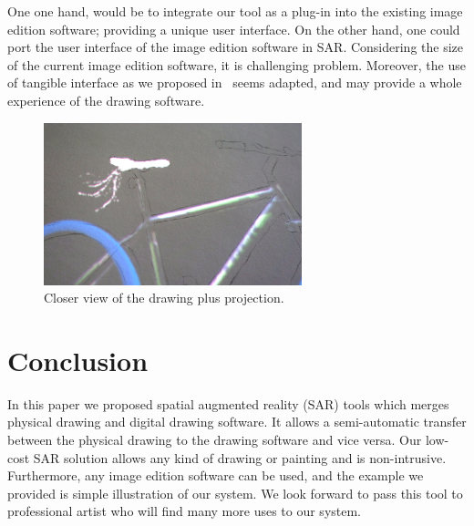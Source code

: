 \documentclass{article}
\begin{document}
One one hand, would be to integrate our tool as a plug-in into the existing image edition software; providing a unique user interface. On the other hand, one could port the user interface of the image edition software in SAR. Considering the size of the current image edition software, it is challenging problem. Moreover, the use of tangible interface as we proposed in~\cite{laviole:2012} seems adapted, and may provide a whole experience of the drawing software. 

\begin{figure}[!tb]
\includegraphics[width = 75mm]{velo4.JPG}
\caption{Closer view of the drawing plus projection.} 
\label{fig:zoom}
\end{figure}

\section{Conclusion}

In this paper we proposed spatial augmented reality (SAR) tools which merges physical drawing and digital drawing software. It allows a semi-automatic transfer between the physical drawing to the drawing software and vice versa. Our low-cost SAR solution allows any kind of drawing or painting and is non-intrusive. Furthermore, any image edition software can be used, and the example we provided is simple illustration of our system. We look forward to pass this tool to professional artist who will find many more uses to our system.




\end{document}
